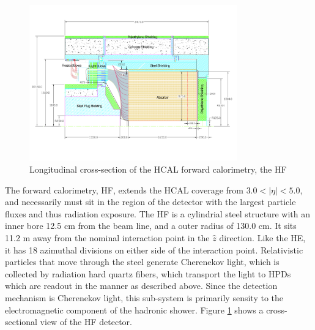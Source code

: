 \begin{figure}[h]
   \centering
  \includegraphics[width=0.8\textwidth]{Figures/CMS_Diagrams/HCAL__HF_layout.pdf}
  \caption{Longitudinal cross-section of the HCAL forward calorimetry,
  the HF} \label{fig:hcal_hf_layout}
\end{figure}

\par The forward calorimetry, HF, extends the HCAL coverage from
$3.0<|\eta|<5.0$, and necessarily must sit in the region of the
detector with the largest particle fluxes and thus radiation
exposure.  The HF is a cylindrial steel structure with an inner bore
12.5 cm from the beam line, and a outer radius of 130.0 cm.  It sits
11.2 m  away from the nominal interaction point in the $\hat{z}$
direction.  Like the HE, it has 18 azimuthal divisions on either side
of the interaction point.  Relativistic particles that move through
the steel generate Cherenekov light, which is collected by radiation
hard quartz fibers, which transport the light to HPDs which are
readout in the manner as described above.  Since the detection
mechanism is Cherenekov light, this sub-system is primarily sensity to
the electromagnetic component of the hadronic shower.  Figure
\ref{fig:hcal_hf_layout} shows a cross-sectional view of the HF
detector.   

%
%
%
%

